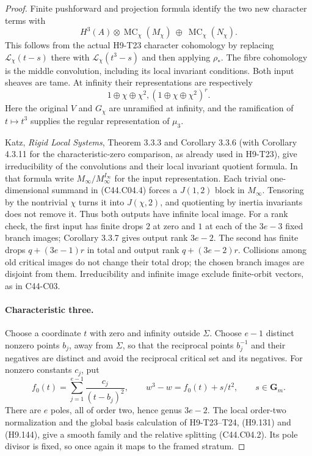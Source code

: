 \documentclass[11pt]{article}
\theoremstyle{remark}\newtheorem{remark}[theorem]{Remark}
\begin{document}
\begin{proof}
Finite pushforward and projection formula identify the two new
character terms with
\[
          H^3(A)\otimes\operatorname{MC}_\chi(M_\chi)
                    \ \oplus\ 
                    \operatorname{MC}_\chi(N_\chi).
 \tag{C44.C04.3}
\]
This follows from the actual H9-T23 character cohomology by replacing
$\mathcal L_\chi(t-s)$ there with
$\mathcal L_\chi(t^3-s)$ and then applying $\rho_*$. The fibre
cohomology is the middle convolution, including its local invariant
conditions. Both input sheaves are tame. At infinity their
representations are respectively
\[
                 1\oplus\chi\oplus\chi^2,
                (1\oplus\chi\oplus\chi^2)^{r}.
 \tag{C44.C04.4}
\]
Here the original $V$ and $G_\chi$ are unramified at infinity,
and the ramification of $t\mapsto t^3$ supplies the regular
representation of $\mu_3$.

Katz, \emph{Rigid Local Systems}, Theorem 3.3.3 and Corollary 3.3.6
(with Corollary 4.3.11 for the characteristic-zero comparison,
as already used in H9-T23),
give irreducibility of the convolutions and their local invariant
quotient formula. In that formula write
$M_\infty/M_\infty^{I_\infty}$ for the input representation.
Each trivial one-dimensional summand in (C44.C04.4) forces a
$J(1,2)$ block in $M_\infty$. Tensoring by the nontrivial $\chi$
turns it into $J(\chi,2)$, and quotienting by inertia invariants
does not remove it. Thus both outputs have infinite local image.
For a rank check, the first input has finite drops $2$ at zero
and $1$ at each of the $3e-3$ fixed branch images; Corollary
3.3.7 gives output rank $3e-2$. The second has finite drops
$q+(3e-1)r$ in total and output rank $q+(3e-2)r$.
Collisions among old critical images do not change their total
drop; the chosen branch images are disjoint from them.
Irreducibility and infinite image exclude finite-orbit vectors,
as in C44-C03.

\paragraph{Characteristic three.}
Choose a coordinate $t$ with zero and infinity outside $\Sigma$.
Choose $e-1$ distinct nonzero points $b_j$, away from $\Sigma$, so
that the reciprocal points $b_j^{-1}$ and their negatives are
distinct and avoid the reciprocal critical set and its negatives.
For nonzero constants $c_j$, put
\[
 f_0(t)=\sum_{j=1}^{e-1}\frac{c_j}{(t-b_j)^2},
 \qquad w^3-w=f_0(t)+s/t^2,\qquad s\in\mathbf G_m.
 \tag{C44.C04.5}
\]
There are $e$ poles, all of order two, hence genus $3e-2$.
The local order-two normalization and the global basis calculation
of H9-T23--T24, (H9.131) and (H9.144), give a smooth family and
the relative splitting (C44.C04.2). Its pole divisor is fixed,
so once again it maps to the framed stratum.


\end{proof}
\end{document}
